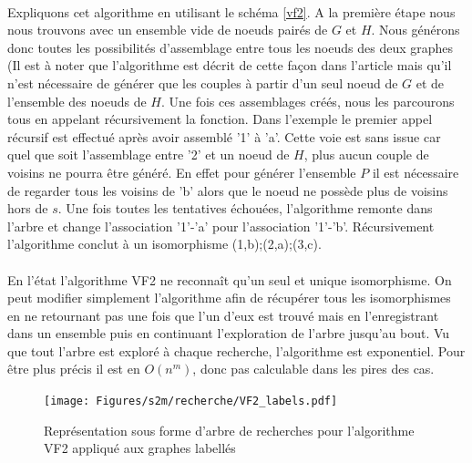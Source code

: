 \documentclass[12pt,french,twoside]{report}
\begin{document}
\paragraph{}Expliquons cet algorithme en utilisant le schéma \ref{vf2}.
A la première étape nous nous trouvons avec un ensemble vide de noeuds pairés de $G$ et $H$.
Nous générons donc toutes les possibilités d'assemblage entre tous les noeuds des deux graphes (Il est à noter que l'algorithme
est décrit de cette façon dans l'article mais qu'il n'est nécessaire de générer que les couples à partir d'un seul noeud de $G$
et de l'ensemble des noeuds de $H$.
Une fois ces assemblages créés, nous les parcourons tous en appelant récursivement la fonction.
Dans l'exemple le premier appel récursif est effectué après avoir assemblé '1' à 'a'.
Cette voie est sans issue car quel que soit l'assemblage entre '2' et un noeud de $H$, plus aucun couple de voisins ne pourra être
généré.
En effet pour générer l'ensemble $P$ il est nécessaire de regarder tous les voisins de 'b' alors que le noeud ne possède plus
de voisins hors de $s$.
Une fois toutes les tentatives échouées, l'algorithme remonte dans l'arbre et change l'association '1'-'a' pour l'association
'1'-'b'.
Récursivement l'algorithme conclut à un isomorphisme {(1,b);(2,a);(3,c)}.

\paragraph{}En l'état l'algorithme VF2 ne reconnaît qu'un seul et unique isomorphisme.
On peut modifier simplement l'algorithme afin de récupérer tous les isomorphismes en ne retournant pas une fois que l'un d'eux est
trouvé mais en l'enregistrant dans un ensemble puis en continuant l'exploration de l'arbre jusqu'au bout.
Vu que tout l'arbre est exploré à chaque recherche, l'algorithme est exponentiel.
Pour être plus précis il est en $O(n^m)$, donc pas calculable dans les pires des cas.

\begin{figure}[!h]
  \texttt{[image: Figures/s2m/recherche/VF2\_labels.pdf]}
  \caption{\label{vf2_labels}Représentation sous forme d'arbre de recherches pour l'algorithme VF2 appliqué aux graphes labellés}
\end{figure}
\end{document}
